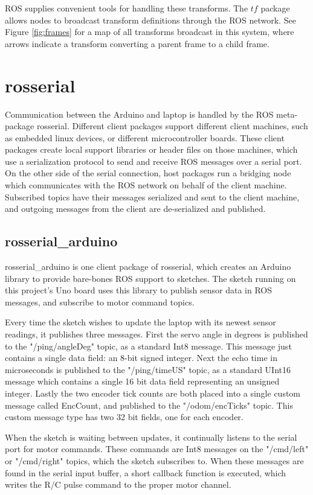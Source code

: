 ROS supplies convenient tools for handling these transforms. The \(tf\) package allows nodes to broadcast transform definitions through the ROS network. See Figure \ref{fig:frames} for a map of all transforms broadcast in this system, where arrows indicate a transform converting a parent frame to a child frame.

\section{rosserial} \label{sectionRosSerial}
Communication between the Arduino and laptop is handled by the ROS meta-package rosserial. Different client packages support different client machines, such as embedded linux devices, or different microcontroller boards. These client packages create local support libraries or header files on those machines, which use a serialization protocol to send and receive ROS messages over a serial port. On the other side of the serial connection, host packages run a bridging node which communicates with the ROS network on behalf of the client machine. Subscribed topics have their messages serialized and sent to the client machine, and outgoing messages from the client are de-serialized and published. 

\subsection{rosserial\_arduino}
rosserial\_arduino is one client package of rosserial, which creates an Arduino library to provide bare-bones ROS support to sketches. The sketch running on this project's Uno board uses this library to publish sensor data in ROS messages, and subscribe to motor command topics.

Every time the sketch wishes to update the laptop with its newest sensor readings, it publishes three messages. First the servo angle in degrees is published to the "/ping/angleDeg" topic, as a standard Int8 message. This message just contains a single data field: an 8-bit signed integer. Next the echo time in microseconds is published to the "/ping/timeUS" topic, as a standard UInt16 message which contains a single 16 bit data field representing an unsigned integer. Lastly the two encoder tick counts are both placed into a single custom message called EncCount, and published to the "/odom/encTicks" topic. This custom message type has two 32 bit fields, one for each encoder.

When the sketch is waiting between updates, it continually listens to the serial port for motor commands. These commands are Int8 messages on the "/cmd/left" or "/cmd/right" topics, which the sketch subscribes to. When these messages are found in the serial input buffer, a short callback function is executed, which writes the R/C pulse command to the proper motor channel.

